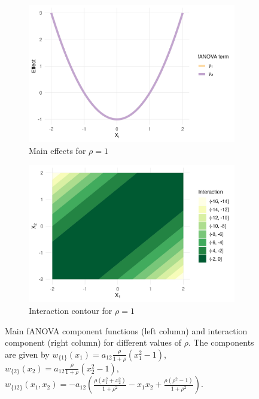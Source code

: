 \begin{figure}[htpb]
    \vspace{0.5em}
    \begin{subfigure}[t]{0.49\textwidth}
        \centering
        \includegraphics[width=\textwidth]{images/experiment_section/interaction_a1p00_a2p00_a11p00_a22p00_a12p20_rhop10_main.png}
        \caption{Main effects for $\rho = 1$}
    \end{subfigure}%
    \hfill
    \begin{subfigure}[t]{0.49\textwidth}
        \centering
        \includegraphics[width=\textwidth]{images/experiment_section/interaction_a1p00_a2p00_a11p00_a22p00_a12p20_rhop10_interaction.png}
        \caption{Interaction contour for $\rho = 1$}
    \end{subfigure}

    \caption{Main fANOVA component functions (left column) and interaction component (right column) for different values of $\rho$. The components are given by $w_{\{1\}}(x_1) = a_{12} \frac{\rho}{1+ \rho} (x_1^2 - 1)$,
    $w_{\{2\}}(x_2) = a_{12} \frac{\rho}{1+ \rho} (x_2^2 - 1)$,
    $w_{\{12\}}(x_1,x_2) = -a_{12}\!\left(\frac{\rho(x_1^2+x_2^2)}{1+\rho^2} - x_1 x_2 + \frac{\rho(\rho^2-1)}{1+\rho^2}\right)$.}
    \label{fig:interaction_combined}
\end{figure}

